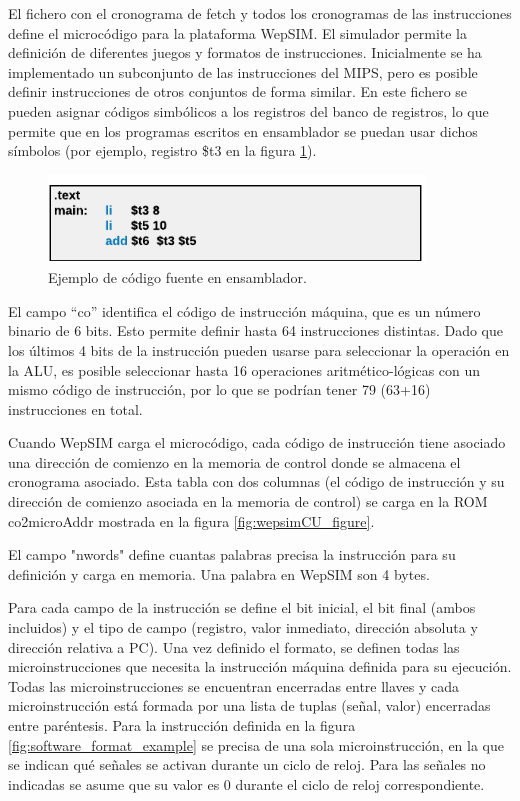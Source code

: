 \vspace{10mm}

El fichero con el cronograma de fetch y todos los cronogramas de las instrucciones define el microcódigo para la plataforma WepSIM. El simulador permite la definición de diferentes juegos y formatos de instrucciones. Inicialmente se ha implementado un subconjunto de las instrucciones del MIPS, pero es posible definir instrucciones de otros conjuntos de forma similar. En este fichero se pueden asignar códigos simbólicos a los registros del banco de registros, lo que permite que en los programas escritos en ensamblador se puedan usar dichos  símbolos (por ejemplo, registro \$t3 en la figura \ref{fig:software_assembly_example}).

\begin{figure}[htbp]
 	\centering
 	\includegraphics[width=10cm]{figures/example_assembly}
 	\caption{Ejemplo de código fuente en ensamblador.}
	\label{fig:software_assembly_example}
\end{figure}

El campo “co” identifica el código de instrucción máquina, que es un número binario de 6 bits. Esto permite definir hasta 64 instrucciones distintas. Dado que los últimos 4 bits de la instrucción pueden usarse para seleccionar la operación en la ALU, es posible seleccionar hasta 16 operaciones aritmético-lógicas con un mismo código de instrucción, por lo que se podrían tener 79 (63+16) instrucciones en total.

Cuando WepSIM carga el microcódigo, cada código de instrucción tiene asociado una dirección de comienzo en la memoria de control donde se almacena el cronograma asociado. Esta tabla con dos columnas (el código de instrucción y su dirección de comienzo asociada en la memoria de control) se carga en la ROM co2microAddr mostrada en la figura \ref{fig:wepsimCU_figure}.

El campo "nwords" define cuantas palabras precisa la instrucción para su definición y carga en memoria. Una palabra en WepSIM son 4 bytes.

Para cada campo de la instrucción se define el bit inicial, el bit final (ambos incluidos) y el tipo de campo (registro, valor inmediato, dirección absoluta y dirección relativa a PC). Una vez definido el formato, se definen todas las microinstrucciones que necesita la instrucción máquina definida para su ejecución. Todas las microinstrucciones se encuentran encerradas entre llaves y cada microinstrucción está formada por una lista de tuplas (señal, valor) encerradas entre paréntesis. Para la instrucción definida en la figura \ref{fig:software_format_example} se precisa de una sola microinstrucción, en la que se indican qué señales se activan durante un ciclo de reloj. Para las señales no indicadas se asume que su valor es 0 durante el ciclo de reloj correspondiente.

